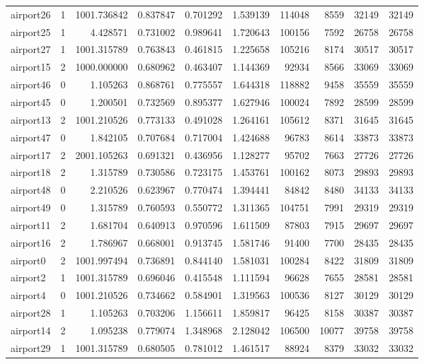 \documentclass[../../../thesis.tex]{subfiles}
\begin{document}
\begin{longtable}{|l|r|r|r|r|r|r|r|r|r|}
airport26 & 1 & 1001.736842 & 0.837847 & 0.701292 & 1.539139 & 114048 & 8559 & 32149 & 32149 \\
airport25 & 1 & 4.428571 & 0.731002 & 0.989641 & 1.720643 & 100156 & 7592 & 26758 & 26758 \\
airport27 & 1 & 1001.315789 & 0.763843 & 0.461815 & 1.225658 & 105216 & 8174 & 30517 & 30517 \\
airport15 & 2 & 1000.000000 & 0.680962 & 0.463407 & 1.144369 & 92934 & 8566 & 33069 & 33069 \\
airport46 & 0 & 1.105263 & 0.868761 & 0.775557 & 1.644318 & 118882 & 9458 & 35559 & 35559 \\
airport45 & 0 & 1.200501 & 0.732569 & 0.895377 & 1.627946 & 100024 & 7892 & 28599 & 28599 \\
airport13 & 2 & 1001.210526 & 0.773133 & 0.491028 & 1.264161 & 105612 & 8371 & 31645 & 31645 \\
airport47 & 0 & 1.842105 & 0.707684 & 0.717004 & 1.424688 & 96783 & 8614 & 33873 & 33873 \\
airport17 & 2 & 2001.105263 & 0.691321 & 0.436956 & 1.128277 & 95702 & 7663 & 27726 & 27726 \\
airport18 & 2 & 1.315789 & 0.730586 & 0.723175 & 1.453761 & 100162 & 8073 & 29893 & 29893 \\
airport48 & 0 & 2.210526 & 0.623967 & 0.770474 & 1.394441 & 84842 & 8480 & 34133 & 34133 \\
airport49 & 0 & 1.315789 & 0.760593 & 0.550772 & 1.311365 & 104751 & 7991 & 29319 & 29319 \\
airport11 & 2 & 1.681704 & 0.640913 & 0.970596 & 1.611509 & 87803 & 7915 & 29697 & 29697 \\
airport16 & 2 & 1.786967 & 0.668001 & 0.913745 & 1.581746 & 91400 & 7700 & 28435 & 28435 \\
airport0 & 2 & 1001.997494 & 0.736891 & 0.844140 & 1.581031 & 100284 & 8422 & 31809 & 31809 \\
airport2 & 1 & 1001.315789 & 0.696046 & 0.415548 & 1.111594 & 96628 & 7655 & 28581 & 28581 \\
airport4 & 0 & 1001.210526 & 0.734662 & 0.584901 & 1.319563 & 100536 & 8127 & 30129 & 30129 \\
airport28 & 1 & 1.105263 & 0.703206 & 1.156611 & 1.859817 & 96425 & 8158 & 30387 & 30387 \\
airport14 & 2 & 1.095238 & 0.779074 & 1.348968 & 2.128042 & 106500 & 10077 & 39758 & 39758 \\
airport29 & 1 & 1001.315789 & 0.680505 & 0.781012 & 1.461517 & 88924 & 8379 & 33032 & 33032 \\

\end{longtable}
\end{document}
